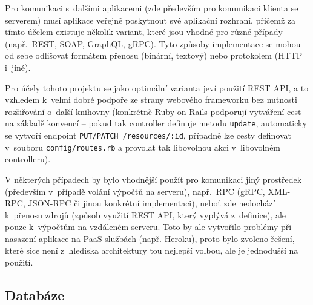 \documentclass[twoside]{ctuthesis}
\begin{document}
\begin{enumerate}[label=\textbf{O\arabic*.}]
Pro komunikaci s~dalšími aplikacemi (zde především pro komunikaci klienta se serverem) musí aplikace veřejně poskytnout své aplikační rozhraní, přičemž za tímto účelem existuje několik variant, které jsou vhodné pro různé případy (např.~REST, SOAP, GraphQL, gRPC). Tyto způsoby implementace se mohou od sebe odlišovat formátem přenosu (binární, textový) nebo protokolem (HTTP i~jiné).

Pro účely tohoto projektu se jako optimální varianta jeví použití REST API, a to vzhledem k~velmi dobré podpoře ze strany webového frameworku bez nutnosti rozšiřování o~další knihovny (konkrétně Ruby on Rails podporují vytváření cest na základě konvencí – pokud tak controller definuje metodu \texttt{update}, automaticky se vytvoří endpoint \texttt{PUT/PATCH /resources/:id}, případně lze cesty definovat v~souboru \texttt{config/routes.rb} a provolat tak libovolnou akci v~libovolném controlleru).

V některých případech by bylo vhodnější použít pro komunikaci jiný prostředek (především v~případě volání výpočtů na serveru), např.~RPC (gRPC, XML-RPC, JSON-RPC či jinou konkrétní implementaci), neboť zde nedochází k~přenosu zdrojů (způsob využití REST API, který vyplývá z~definice), ale pouze k~výpočtům na vzdáleném serveru. Toto by ale vytvořilo problémy při nasazení aplikace na PaaS službách (např. Heroku), proto bylo zvoleno řešení, které sice není z~hlediska architektury tou nejlepší volbou, ale je jednodušší na použití.

\subsection{Databáze}




\end{enumerate}
\end{document}
